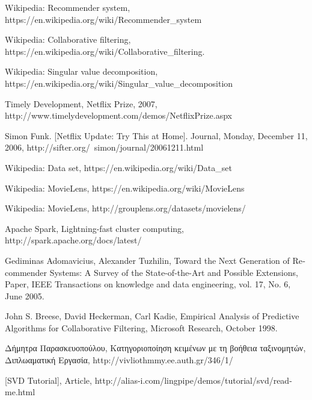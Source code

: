 \documentclass{report}
\begin{document}
{\vspace{20mm} 

\newpage

\begin{thebibliography}{9}


\textlatin{Wikipedia: Recommender system,
https://en.wikipedia.org/wiki/Recommender\_system}


\textlatin{Wikipedia: Collaborative filtering,
https://en.wikipedia.org/wiki/Collaborative\_filtering}.

\textlatin{Wikipedia: Singular value decomposition,
https://en.wikipedia.org/wiki/Singular\_value\_decomposition}

\textlatin{Timely Development, Netflix Prize, 2007, http://www.timelydevelopment.com/demos/NetflixPrize.aspx}

\textlatin{Simon Funk. [Netflix Update: Try This at Home]. Journal, Monday, December 11, 2006, 
http://sifter.org/~simon/journal/20061211.html}

\textlatin{Wikipedia: Data set,
https://en.wikipedia.org/wiki/Data_set}

\textlatin{Wikipedia: MovieLens,
https://en.wikipedia.org/wiki/MovieLens}

\textlatin{Wikipedia: MovieLens,
http://grouplens.org/datasets/movielens/}

\textlatin{Apache Spark, Lightning-fast cluster computing,
http://spark.apache.org/docs/latest/}

\textlatin{Gediminas Adomavicius, Alexander Tuzhilin, Toward the Next Generation of Recommender
Systems: A Survey of the State-of-the-Art and
Possible Extensions, Paper, IEEE Transactions on knowledge and data engineering, vol. 17, No. 6, June 2005}. 


\textlatin{John S. Breese, David Heckerman, Carl Kadie, Empirical Analysis of Predictive Algorithms for Collaborative Filtering, Microsoft Research, October 1998}. 

Δήμητρα Παρασκευοπούλου, Κατηγοριοποίηση κειμένων με τη βοήθεια ταξινομητών, Διπλωαματική Εργασία,\textlatin{ 
http://vivliothmmy.ee.auth.gr/346/1/}



\textlatin{[SVD Tutorial], Article, 
http://alias-i.com/lingpipe/demos/tutorial/svd/read-me.html}


\end{thebibliography}}
\end{document}
